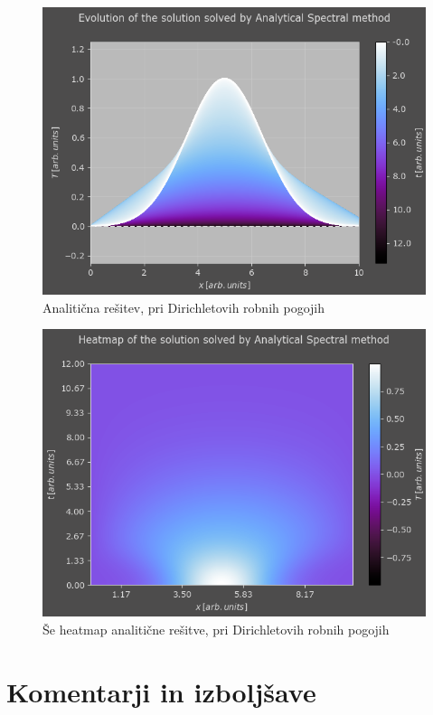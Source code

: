 \documentclass[a4paper]{article}
\begin{document}
\begin{figure}[H]
    \centering
        \includegraphics[width=\linewidth]{./images/S_Analytic_D.png}
        \caption{Analitična rešitev, pri Dirichletovih robnih pogojih}
    \label{fig:5}
\end{figure}

\begin{figure}[H]
    \centering
        \includegraphics[width=\linewidth]{./images/S_Analytic_D_Heatmap.png}
        \caption{Še heatmap analitične rešitve, pri Dirichletovih robnih pogojih}
    \label{fig:6}
\end{figure}

\section{Komentarji in izboljšave}

\newpage


\end{document}
